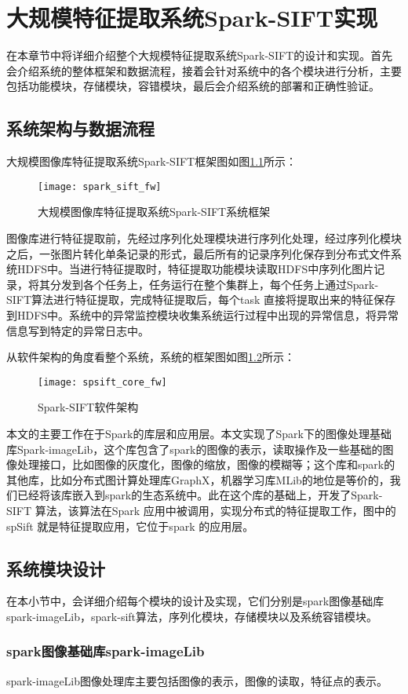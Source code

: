 ﻿\chapter{大规模特征提取系统Spark-SIFT实现}
在本章节中将详细介绍整个大规模特征提取系统Spark-SIFT的设计和实现。首先会介绍系统的整体框架和数据流程，接着会针对系统中的各个模块进行分析，主要包括功能模块，存储模块，容错模块，最后会介绍系统的部署和正确性验证。

\section{系统架构与数据流程}
大规模图像库特征提取系统Spark-SIFT框架图如图\ref{fig:spark_sift_fw}所示：
\begin{figure}[htp]
\centering
\texttt{[image: spark\_sift\_fw]}
\caption{大规模图像库特征提取系统Spark-SIFT系统框架}
\label{fig:spark_sift_fw}
\end{figure}
图像库进行特征提取前，先经过序列化处理模块进行序列化处理，经过序列化模块之后，一张图片转化单条记录的形式，最后所有的记录序列化保存到分布式文件系统HDFS中。当进行特征提取时，特征提取功能模块读取HDFS中序列化图片记录，将其分发到各个任务上，任务运行在整个集群上，每个任务上通过Spark-SIFT算法进行特征提取，完成特征提取后，每个task 直接将提取出来的特征保存到HDFS中。系统中的异常监控模块收集系统运行过程中出现的异常信息，将异常信息写到特定的异常日志中。

从软件架构的角度看整个系统，系统的框架图如图\ref{fig:spsift_core_fw}所示：
\begin{figure}[htp]
\centering
\texttt{[image: spsift\_core\_fw]}
\caption{Spark-SIFT软件架构}
\label{fig:spsift_core_fw}
\end{figure}
本文的主要工作在于Spark的库层和应用层。本文实现了Spark下的图像处理基础库Spark-imageLib，这个库包含了spark的图像的表示，读取操作及一些基础的图像处理接口，比如图像的灰度化，图像的缩放，图像的模糊等；这个库和spark的其他库，比如分布式图计算处理库GraphX，机器学习库MLib的地位是等价的，我们已经将该库嵌入到spark的生态系统中。此在这个库的基础上，开发了Spark-SIFT 算法，该算法在Spark 应用中被调用，实现分布式的特征提取工作，图中的spSift 就是特征提取应用，它位于spark 的应用层。
\section{系统模块设计}
在本小节中，会详细介绍每个模块的设计及实现，它们分别是spark图像基础库spark-imageLib，spark-sift算法，序列化模块，存储模块以及系统容错模块。
\subsection{spark图像基础库spark-imageLib}
spark-imageLib图像处理库主要包括图像的表示，图像的读取，特征点的表示。
